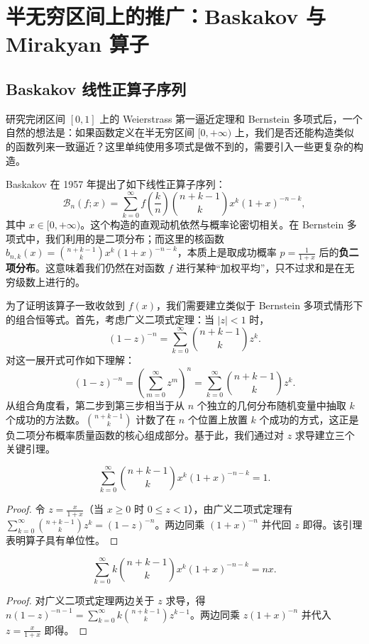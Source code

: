\section{半无穷区间上的推广：Baskakov 与 Mirakyan 算子}

\subsection{Baskakov 线性正算子序列}

研究完闭区间 $[0,1]$ 上的 Weierstrass 第一逼近定理和 Bernstein 多项式后，一个自然的想法是：如果函数定义在半无穷区间 $[0, +\infty)$ 上，我们是否还能构造类似的函数列来一致逼近？这里单纯使用多项式是做不到的，需要引入一些更复杂的构造。

Baskakov 在 1957 年提出了如下线性正算子序列：
\[
\mathcal{B}_n(f;x) = \sum_{k=0}^{\infty} f\left( \frac{k}{n} \right) \binom{n+k-1}{k} x^k (1+x)^{-n-k},
\]
其中 $x \in [0, +\infty)$。这个构造的直观动机依然与概率论密切相关。在 Bernstein 多项式中，我们利用的是二项分布；而这里的核函数 $b_{n,k}(x) = \binom{n+k-1}{k} x^k (1+x)^{-n-k}$，本质上是取成功概率 $p = \frac{1}{1+x}$ 后的\textbf{负二项分布}。这意味着我们仍然在对函数 $f$ 进行某种“加权平均”，只不过求和是在无穷级数上进行的。

为了证明该算子一致收敛到 $f(x)$，我们需要建立类似于 Bernstein 多项式情形下的组合恒等式。首先，考虑广义二项式定理：当 $|z| < 1$ 时，
\[
(1-z)^{-n} = \sum_{k=0}^{\infty} \binom{n+k-1}{k} z^k.
\]
对这一展开式可作如下理解：
\[
(1-z)^{-n} = \left( \sum_{m=0}^{\infty} z^m \right)^n = \sum_{k=0}^{\infty} \binom{n+k-1}{k} z^k.
\]
从组合角度看，第二步到第三步相当于从 $n$ 个独立的几何分布随机变量中抽取 $k$ 个成功的方法数。$\binom{n+k-1}{k}$ 计数了在 $n$ 个位置上放置 $k$ 个成功的方式，这正是负二项分布概率质量函数的核心组成部分。基于此，我们通过对 $z$ 求导建立三个关键引理。

\begin{lemma}
\label{lem:baskakov1}
\[
\sum_{k=0}^{\infty} \binom{n+k-1}{k} x^k (1+x)^{-n-k} = 1.
\]
\end{lemma}
\begin{proof}
令 $z = \frac{x}{1+x}$（当 $x \geq 0$ 时 $0 \leq z < 1$），由广义二项式定理有 $\sum_{k=0}^{\infty} \binom{n+k-1}{k} z^k = (1-z)^{-n}$。两边同乘 $(1+x)^{-n}$ 并代回 $z$ 即得。该引理表明算子具有单位性。
\end{proof}

\begin{lemma}
\label{lem:baskakov2}
\[
\sum_{k=0}^{\infty} k \binom{n+k-1}{k} x^k (1+x)^{-n-k} = nx.
\]
\end{lemma}
\begin{proof}
对广义二项式定理两边关于 $z$ 求导，得 $n(1-z)^{-n-1} = \sum_{k=0}^{\infty} k \binom{n+k-1}{k} z^{k-1}$。两边同乘 $z(1+x)^{-n}$ 并代入 $z = \frac{x}{1+x}$ 即得。
\end{proof}

